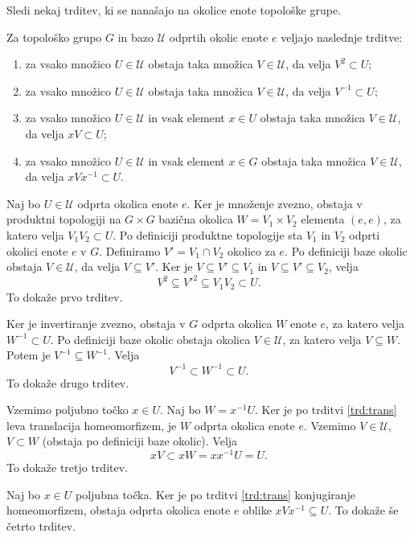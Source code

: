 \documentclass[mat1]{fmfdelo}
\newcommand{\Ucurl}{\mathcal{U}}
\begin{document}
Sledi nekaj trditev, ki se nanašajo na okolice enote topološke grupe.

\begin{trditev}\label{trd:okolice}
Za topološko grupo $G$ in bazo $\Ucurl$ odprtih okolic enote $e$ veljajo naslednje trditve:
\begin{enumerate}
\item za vsako množico $U \in \Ucurl$ obstaja taka množica $V \in \Ucurl$, da velja $V^{2} \subset U$;
\item za vsako množico $U \in \Ucurl$ obstaja taka množica $V \in \Ucurl$, da velja $V^{-1} \subset U$;
\item za vsako množico $U \in \Ucurl$ in vsak element $x \in U$ obstaja taka množica $V \in \Ucurl$, da velja $xV \subset U$;
\item za vsako množico $U \in \Ucurl$ in vsak element $x \in G$ obstaja taka množica $V \in \Ucurl$, da velja $xVx^{-1} \subset U$.
\end{enumerate}
\end{trditev}

\begin{dokaz}
Naj bo $U \in \Ucurl$  odprta okolica enote $e$. Ker je množenje zvezno, obstaja v produktni topologiji na $G \times G$ bazična okolica $W = V_1 \times V_2$ elementa $(e, e)$, za katero velja $V_1V_2 \subset U$. Po definiciji produktne topologije sta $V_1$ in $V_2$ odprti okolici enote $e$ v $G$. Definiramo $V' = V_1 \cap V_2$ okolico za $e$. Po definiciji baze okolic obstaja $V \in \Ucurl$, da velja $V \subseteq V'$. Ker je $V \subseteq V' \subseteq V_1$ in $V \subseteq V' \subseteq V_2$, velja \[V^2 \subseteq V'^2 \subseteq V_1V_2 \subset U.\] To dokaže prvo trditev.

Ker je invertiranje zvezno, obstaja v $G$ odprta okolica $W$ enote $e$, za katero velja $W^{-1} \subset U$. Po definiciji baze okolic obstaja okolica $V \in \Ucurl$, za katero velja $V \subseteq W$. Potem je $V^{-1} \subseteq W^{-1}$. Velja \[V^{-1} \subset W^{-1} \subset U.\] To dokaže drugo trditev.

Vzemimo poljubno točko $x \in U$. Naj bo $W = x^{-1}U$. Ker je po trditvi \ref{trd:trans} leva translacija homeomorfizem, je $W$ odprta okolica enote $e$. Vzemimo $V \in \Ucurl$, $V \subset W$ (obstaja po definiciji baze okolic). Velja \[xV \subset xW = xx^{-1}U = U.\]
To dokaže tretjo trditev.

Naj bo $x \in U$ poljubna točka. Ker je po trditvi \ref{trd:trans} konjugiranje homeomorfizem, obstaja odprta okolica enote $e$ oblike $xVx^{-1} \subseteq U$.
To dokaže še četrto trditev.
\end{dokaz}
\end{document}
